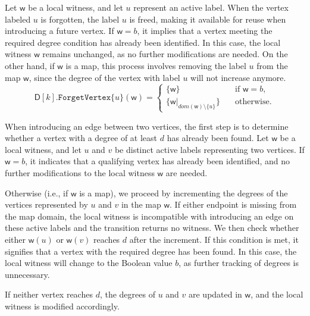 \documentclass[11pt,a4paper]{article}
\newcommand{\treewidthvalue}{k}
\newcommand{\forgetvertextype}[1]{\mathtt{ForgetVertex}\{#1\}}
\newcommand{\vertexone}{u}
\newcommand{\vertextwo}{v}
\newcommand{\awitness}{\mathsf{w}}
\newcommand{\dpcore}{\mathsf{D}}
\newcommand{\domain}{dom}
\newcommand{\maxdegreeparameter}{d}
\newcommand{\maxdegreefound}{b}
\begin{document}
{ Let $\awitness$ be a local witness, and let $\vertexone$ represent an active label. When the vertex labeled $\vertexone$ is forgotten, the label $\vertexone$ is freed, making it available for reuse when introducing a future vertex. If $\awitness= \maxdegreefound$, it implies that a vertex meeting the required degree condition has already been identified. In this case, the local witness $\awitness$ remains unchanged, as no further modifications are needed. On the other hand, if $\awitness$ is a map, this process involves removing the label $\vertexone$ from the map $\awitness$, since the degree of the vertex with label $\vertexone$ will not increase anymore.
\[
\dpcore[\treewidthvalue].\forgetvertextype{\vertexone}(\awitness) = \begin{cases}
\{\awitness\} & \quad \text{if } \awitness=\maxdegreefound, \\[6pt]
\{\awitness|_{\domain(\awitness)\setminus\{\vertexone\}}\} & \quad \text{otherwise.}
\end{cases}
\]

 When introducing an edge between two vertices, the first step is to determine whether a vertex with a degree of at least $\maxdegreeparameter$ has already been found. Let $\awitness$ be a local witness, and let $\vertexone$ and $\vertextwo$ be distinct active labels representing two vertices. If $\awitness = \maxdegreefound$, it indicates that a qualifying vertex has already been identified, and no further modifications to the local witness $\awitness$ are needed.

Otherwise (i.e., if $\awitness$ is a map), we proceed by incrementing the degrees of the vertices represented by $\vertexone$ and $\vertextwo$ in the map $\awitness$. If either endpoint is missing from the map domain, the local witness is incompatible with introducing an edge on these active labels and the transition returns no witness. We then check whether either $\awitness(\vertexone)$ or $\awitness(\vertextwo)$ reaches $\maxdegreeparameter$ after the increment. If this condition is met, it signifies that a vertex with the required degree has been found. In this case, the local witness will change to the Boolean value $\maxdegreefound$, as further tracking of degrees is unnecessary.

If neither vertex reaches $\maxdegreeparameter$, the degrees of $\vertexone$ and $\vertextwo$ are updated in $\awitness$, and the local witness is modified accordingly.

}
\end{document}
